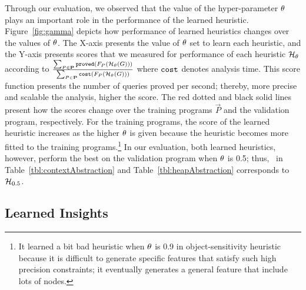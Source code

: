 Through our evaluation, we observed that the value of the hyper-parameter ${\theta}$ plays an important role in the performance of the learned heuristic.
Figure~\ref{fig:gamma} depicts how performance of learned heuristics changes over the values of  ${\theta}$.
The X-axis presents the value of ${\theta}$ set to learn each heuristic, and
the Y-axis presents scores that we measured for performance of each heuristic $\mathcal{H}_{{\theta}}$ according to
${\sum_{P\in\mathbf{P}}{\tt proved}(F_P(\mathcal{H}_{{\theta}}(G)))}\over{\sum_{P\in\mathbf{P}}
  {\tt cost}(F_P(\mathcal{H}_{{\theta}}(G)))}$ where ${\tt cost}$ denotes analysis time.
This score function presents the number of queries proved per second; thereby, more precise and scalable the analysis,
higher the score.
The red dotted and black solid lines present how the scores change over
the training programs $\vec{P}$ %
and the validation program, respectively.
For the training programs, the score of the learned heuristic increases as the higher ${\theta}$ is given
because the heuristic becomes more fitted to the training programs.\footnote{It learned a bit bad heuristic when ${\theta}$ is 0.9 in
  object-sensitivity heuristic because it is
difficult to generate specific features that satisfy such high precision
constraints; it eventually generates a general feature that include lots
of nodes.}
In our evaluation, both learned heuristics, however, perform the best on the validation program when ${\theta}$ is 0.5;
thus, \OurCtx~in Table~\ref{tbl:contextAbstraction} and Table~\ref{tbl:heapAbstraction} corresponds to $\mathcal{H}_{0.5}$.










\subsection{Learned Insights}\label{sec:graphick:learnedInsight}

